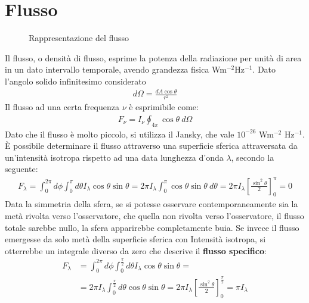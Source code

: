 \documentclass[a4paper, oneside]{book}
\begin{document}
\section{Flusso}
\begin{figure}
    \centering
    \caption{Rappresentazione del flusso}
\end{figure}
Il flusso, o densità di flusso, esprime la potenza della radiazione per unità di area in un
dato intervallo temporale, avendo 
grandezza fisica Wm$^{-2}$Hz$^{-1}$.
Dato l'angolo solido infinitesimo considerato
\begin{gather*}
    d\Omega = \frac{dA\cos\theta}{r^{2} }
\end{gather*}
Il flusso ad una certa frequenza $\nu$ è esprimibile come:
\begin{align}
        F_{\nu} = I_{\nu} \oint _{4\pi} \cos\theta \ d\Omega
\end{align}
Dato che il flusso è molto piccolo, si utilizza il Jansky, che vale $10^{-26}$ Wm$^{-2}$ Hz$^{-1}$.
È possibile determinare il flusso attraverso una superficie sferica attraversata da un'intensità isotropa
 rispetto ad una data lunghezza d'onda $\lambda$, secondo la seguente:
\begin{align*}
    F_\lambda = \int_{0}^{2\pi}d\phi\int_{0}^{\pi} d\theta I_\lambda \cos\theta\sin\theta 
    = 2\pi I_\lambda \int_{0}^{\pi}\cos\theta\sin\theta \ d\theta 
    = 2\pi I_\lambda \left[\frac{\sin^{2}\theta}{2}\right]^{\pi}_{0} = 0
\end{align*}
Data la simmetria della sfera, se si potesse osservare contemporaneamente sia la metà rivolta verso 
l'osservatore, che quella non rivolta verso l'osservatore, il flusso totale sarebbe nullo, la sfera
apparirebbe completamente buia. Se invece il flusso emergesse da solo metà 
della superficie sferica con Intensità isotropa, si otterrebbe un integrale
diverso da zero che descrive il \textbf{flusso specifico}:
\begin{align*}
    F_\lambda &= \int_{0}^{2\pi}d\phi\int_{0}^{\frac{\pi}{2}} d\theta I_\lambda \cos\theta\sin\theta = \\
    &= 2\pi I_\lambda \int_{0}^{\frac{\pi}{2}} d\theta \cos\theta \sin\theta = 2\pi I_\lambda \left[\frac{\sin^{2}\theta}{2}\right]^{\frac{\pi}{2}}_{0} = \pi I_\lambda
\end{align*}
\end{document}
